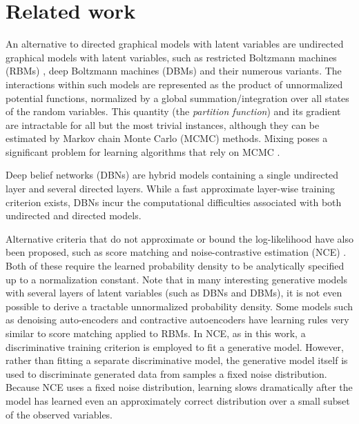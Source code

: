 \section{Related work}

An alternative to directed graphical models with latent variables are undirected graphical models with latent variables, such as restricted Boltzmann machines (RBMs) \cite{27_10.7551/mitpress/5236.003.0009,16_10.1162/neco.2006.18.7.1527}, deep Boltzmann machines (DBMs) \cite{26_salakhutdinov2009deep} and their numerous variants. The interactions within such models are represented as the product of unnormalized potential functions, normalized by a global summation/integration over all states of the random variables. This quantity (the \emph{partition function}) and its gradient are intractable for all but the most trivial instances, although they can be estimated by Markov chain Monte Carlo (MCMC) methods. Mixing poses a significant problem for learning algorithms that rely on MCMC \cite{3_pmlr-v28-bengio13,5_bengio2014deepgenerativestochasticnetworks}.

\noindent Deep belief networks (DBNs) \cite{16_10.1162/neco.2006.18.7.1527} are hybrid models containing a single undirected layer and several directed layers. While a fast approximate layer-wise training criterion exists, DBNs incur the computational difficulties associated with both undirected and directed models.

\noindent Alternative criteria that do not approximate or bound the log-likelihood have also been proposed, such as score matching \cite{18_JMLR:v6:hyvarinen05a} and noise-contrastive estimation (NCE) \cite{13_pmlr-v9-gutmann10a}. Both of these require the learned probability density to be analytically specified up to a normalization constant. Note that in many interesting generative models with several layers of latent variables (such as DBNs and DBMs), it is not even possible to derive a tractable unnormalized probability density. Some models such as denoising auto-encoders \cite{30_vincent2008extracting} and contractive autoencoders have learning rules very similar to score matching applied to RBMs. In NCE, as in this work, a discriminative training criterion is employed to ﬁt a generative model. However, rather than fitting a separate discriminative model, the generative model itself is used to discriminate generated data from samples a fixed noise distribution. Because NCE uses a fixed noise distribution, learning slows dramatically after the model has learned even an approximately correct distribution over a small subset of the observed variables.

